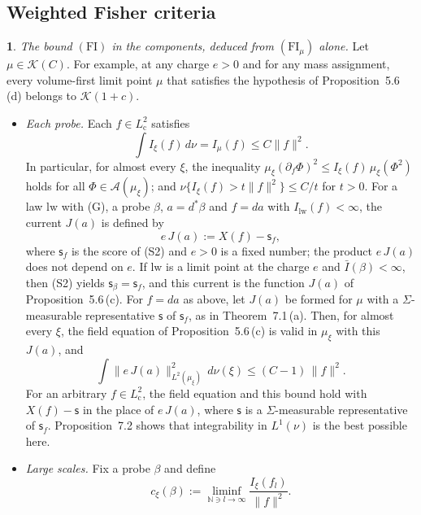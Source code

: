 \documentclass[11pt]{amsart}
\newcommand{\namedhead}{}
\theoremstyle{definition}
\newtheorem*{namedinner}{\namedhead}
\newenvironment{named}[1]{\renewcommand{\namedhead}{#1}\begin{namedinner}}{\end{namedinner}}
\begin{document}
\subsection{Weighted Fisher criteria}
\begin{named}{Proposition 7.3}
\emph{The bound $(\mathrm{FI})$ in the components, deduced from $(\mathrm{FI}_\mu)$ alone.}
Let $\mu\in\mathcal K(C)$.
For example, at any charge $e>0$ and for any mass assignment, every volume-first limit point $\mu$ that satisfies the hypothesis of Proposition~5.6\,(d) belongs to $\mathcal K(1+c)$.
\begin{itemize}
\item[(a)] \emph{Each probe.}
Each $f\in L^2_{\mathrm c}$ satisfies
\begin{equation*}
\int I_\xi(f)\,d\nu=I_\mu(f)\le C\|f\|^2.
\end{equation*}
In particular, for almost every $\xi$, the inequality $\mu_\xi(\partial_f\Phi)^2\le I_\xi(f)\,\mu_\xi(\Phi^2)$ holds for all $\Phi\in\mathcal A(\mu_\xi)$;
and $\nu\{I_\xi(f)>t\|f\|^2\}\le C/t$ for $t>0$.
For a law $\mathrm{lw}$ with (G), a probe $\beta$, $a=d^*\beta$ and $f=da$ with $I_{\mathrm{lw}}(f)<\infty$, the current $J(a)$ is defined by
\begin{equation*}
e\,J(a):=X(f)-\mathsf s_f,
\end{equation*}
where $\mathsf s_f$ is the score of (S2) and $e>0$ is a fixed number;
the product $e\,J(a)$ does not depend on $e$.
If $\mathrm{lw}$ is a limit point at the charge $e$ and $\bar I(\beta)<\infty$, then (S2) yields $\mathsf s_\beta=\mathsf s_f$, and this current is the function $J(a)$ of Proposition~5.6\,(c).
For $f=da$ as above, let $J(a)$ be formed for $\mu$ with a $\Sigma$-measurable representative $\mathsf s$ of $\mathsf s_f$, as in Theorem~7.1\,(a).
Then, for almost every $\xi$, the field equation of Proposition~5.6\,(c) is valid in $\mu_\xi$ with this $J(a)$, and
\begin{equation*}
\int\|e\,J(a)\|^2_{L^2(\mu_\xi)}\,d\nu(\xi)\le(C-1)\,\|f\|^2.
\end{equation*}
For an arbitrary $f\in L^2_{\mathrm c}$, the field equation and this bound hold with $X(f)-\mathsf s$ in the place of $e\,J(a)$, where $\mathsf s$ is a $\Sigma$-measurable representative of $\mathsf s_f$.
Proposition~7.2 shows that integrability in $L^1(\nu)$ is the best possible here.
\item[(b)] \emph{Large scales.}
Fix a probe $\beta$ and define
\begin{equation*}
c_\xi(\beta):=\liminf_{\mathbb N\ni l\to\infty}\frac{I_\xi(f_l)}{\|f\|^2}.

\end{equation*}
\end{itemize}
\end{named}
\end{document}
